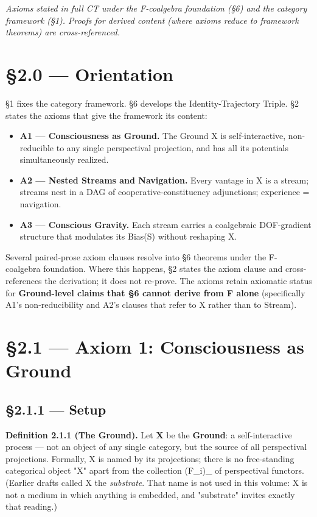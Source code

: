 \documentclass[11pt, openany]{book}
\newcommand{\sectionbreak}{\clearpage}
\begin{document}
\textit{Axioms stated in full CT under the F-coalgebra foundation (§6) and the category framework (§1). Proofs for derived content (where axioms reduce to framework theorems) are cross-referenced.}

\sectionbreak

\section{§2.0 --- Orientation}

§1 fixes the category framework. §6 develops the Identity-Trajectory Triple. §2 states the axioms that give the framework its content:

\begin{itemize}
\item \textbf{A1 --- Consciousness as Ground.} The Ground X is self-interactive, non-reducible to any single perspectival projection, and has all its potentials simultaneously realized.
\item \textbf{A2 --- Nested Streams and Navigation.} Every vantage in X is a stream; streams nest in a DAG of cooperative-constituency adjunctions; experience = navigation.
\item \textbf{A3 --- Conscious Gravity.} Each stream carries a coalgebraic DOF-gradient structure that modulates its Bias(S) without reshaping X.
\end{itemize}

Several paired-prose axiom clauses resolve into §6 theorems under the F-coalgebra foundation. Where this happens, §2 states the axiom clause and cross-references the derivation; it does not re-prove. The axioms retain axiomatic status for \textbf{Ground-level claims that §6 cannot derive from F alone} (specifically A1's non-reducibility and A2's clauses that refer to X rather than to Stream).

\sectionbreak

\section{§2.1 --- Axiom 1: Consciousness as Ground}

\subsection{§2.1.1 --- Setup}

\textbf{Definition 2.1.1 (The Ground).} Let \textbf{X} be the \textbf{Ground}: a self-interactive process --- not an object of any single category, but the source of all perspectival projections. Formally, X is named by its projections; there is no free-standing categorical object "X" apart from the collection (F\_\allowbreak{}i)\_ of perspectival functors. (Earlier drafts called X the \textit{substrate}. That name is not used in this volume: X is not a medium in which anything is embedded, and "substrate" invites exactly that reading.)
\end{document}
